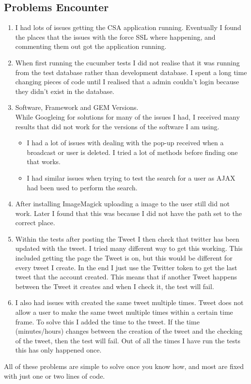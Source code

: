 \documentclass[10pt,a4paper,titlepage]{article}
\begin{document}
\subsection{Problems Encounter}
\begin{enumerate}
\item I had lots of issues getting the CSA application running. Eventually I found the places that the issues with the force SSL where happening, and commenting them out got the application running. 

\item When first running the cucumber tests I did not realise that it was running from the test database rather than development database. I spent a long time changing pieces of code until I realised that a admin couldn't login because they didn't exist in the database. 

\item Software, Framework and GEM Versions.\\
	While Googleing for solutions for many of the issues I had, I received many results that did not work for the versions of the software I am using.  
	\begin{itemize}
	\item I had a lot of issues with dealing with the pop-up received when a broadcast or user is deleted. I tried a lot of methods before finding one that works. 
	\item I had similar issues when trying to test the search for a user as AJAX had been used to perform the search.
	\end{itemize}

\item After installing ImageMagick uploading a image to the user still did not work. Later I found that this was because I did not have the path set to the correct place. 
	
\item Within the tests after posting the Tweet I then check that twitter has been updated with the tweet. I tried many different way to get this working. This included getting the page the Tweet is on, but this would be different for every tweet I create. In the end I just use the Twitter token to get the last tweet that the account created. This means that if another Tweet happens between the Tweet it creates and when I check it, the test will fail.

\item I also had issues with created the same tweet multiple times. Tweet does not allow a user to make the same tweet multiple times within a certain time frame. To solve this I added the time to the tweet. If the time (minutes/hours) changes between the creation of the tweet and the checking of the tweet, then the test will fail. Out of all the times I have run the tests this has only happened once. 	

\end{enumerate}
All of these problems are simple to solve once you know how, and most are fixed with just one or two lines of code.
\end{document}
